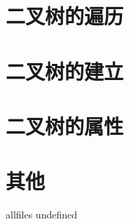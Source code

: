 \documentclass{article}
\begin{document}
\begin{CJK}{UTF8}{gbsn}     %

\else
    
\section{二叉树的遍历}

\newpage
\section{二叉树的建立}

\newpage
\section{二叉树的属性}

\newpage
\section{其他}

\newpage

\fi

\ifx allfiles undefined
\end{CJK}
\end{document}

